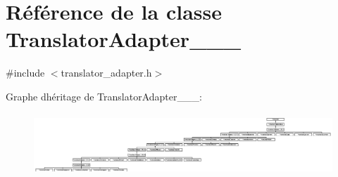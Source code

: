 \hypertarget{class_translator_adapter__1__8__4}{}\section{Référence de la classe Translator\+Adapter\+\_\+\_\+\_}
\label{class_translator_adapter__1__8__4}


{\ttfamily \#include $<$translator\+\_\+adapter.\+h$>$}

Graphe d\textquotesingle{}héritage de Translator\+Adapter\+\_\+\_\+\_\+:\begin{figure}[H]
\begin{center}
\leavevmode
\includegraphics[height=2.347561cm]{class_translator_adapter__1__8__4}
\end{center}
\end{figure}
